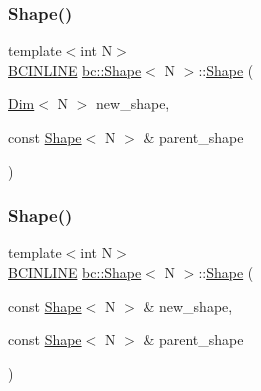 \subsubsection{\texorpdfstring{Shape()}{Shape()}\hspace{0.1cm}{\footnotesize\ttfamily [4/6]}}
{\footnotesize\ttfamily template$<$int N$>$ \\
\hyperlink{common_8h_a6699e8b0449da5c0fafb878e59c1d4b1}{B\+C\+I\+N\+L\+I\+NE} \hyperlink{structbc_1_1Shape}{bc\+::\+Shape}$<$ N $>$\+::\hyperlink{structbc_1_1Shape}{Shape} (\begin{DoxyParamCaption}\item[{\hyperlink{structbc_1_1Dim}{Dim}$<$ N $>$}]{new\+\_\+shape,  }\item[{const \hyperlink{structbc_1_1Shape}{Shape}$<$ N $>$ \&}]{parent\+\_\+shape }\end{DoxyParamCaption})\hspace{0.3cm}{\ttfamily [inline]}}

\mbox{\label{structbc_1_1Shape_a79f445db712d0ee7126413ba57377b34}} 
\subsubsection{\texorpdfstring{Shape()}{Shape()}\hspace{0.1cm}{\footnotesize\ttfamily [5/6]}}
{\footnotesize\ttfamily template$<$int N$>$ \\
\hyperlink{common_8h_a6699e8b0449da5c0fafb878e59c1d4b1}{B\+C\+I\+N\+L\+I\+NE} \hyperlink{structbc_1_1Shape}{bc\+::\+Shape}$<$ N $>$\+::\hyperlink{structbc_1_1Shape}{Shape} (\begin{DoxyParamCaption}\item[{const \hyperlink{structbc_1_1Shape}{Shape}$<$ N $>$ \&}]{new\+\_\+shape,  }\item[{const \hyperlink{structbc_1_1Shape}{Shape}$<$ N $>$ \&}]{parent\+\_\+shape }\end{DoxyParamCaption})\hspace{0.3cm}{\ttfamily [inline]}}

\mbox{\label{structbc_1_1Shape_a54d66d5709fc58c31a5d3b29fee03fec}} 
